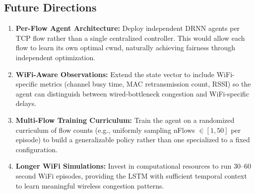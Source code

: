 \documentclass[12pt, a4paper]{article}
\begin{document}
\subsection*{Future Directions}

\begin{enumerate}
    \item \textbf{Per-Flow Agent Architecture:} Deploy independent DRNN agents per TCP flow rather than a single centralized controller. This would allow each flow to learn its own optimal cwnd, naturally achieving fairness through independent optimization.
    \item \textbf{WiFi-Aware Observations:} Extend the state vector to include WiFi-specific metrics (channel busy time, MAC retransmission count, RSSI) so the agent can distinguish between wired-bottleneck congestion and WiFi-specific delays.
    \item \textbf{Multi-Flow Training Curriculum:} Train the agent on a randomized curriculum of flow counts (e.g., uniformly sampling nFlows $\in [1, 50]$ per episode) to build a generalizable policy rather than one specialized to a fixed configuration.
    \item \textbf{Longer WiFi Simulations:} Invest in computational resources to run 30--60 second WiFi episodes, providing the LSTM with sufficient temporal context to learn meaningful wireless congestion patterns.
\end{enumerate}

\clearpage
\end{document}
